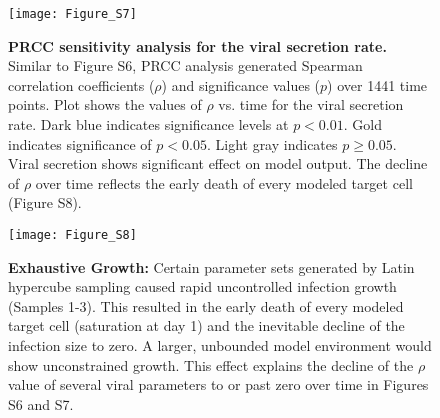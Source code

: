 \documentclass[preprint,10pt,authoryear]{article}
\newcommand{\drew}[1]{{\color{dkgreen}#1}}
\begin{document}
\begin{figure}[ht!]
\begin{center}
	\texttt{[image: Figure\_S7]}
	\caption{\textbf{PRCC sensitivity analysis for the viral secretion rate.} Similar to Figure S6, PRCC analysis generated Spearman correlation coefficients ($\rho$) and significance values ($p$) over 1441 time points.  Plot shows the values of $\rho$ vs. time for the viral secretion rate.  Dark blue indicates significance levels at $p < 0.01$.  Gold indicates significance of $p < 0.05$.  Light gray indicates $p \geq 0.05$.  Viral secretion shows significant effect on model output.  The decline of $\rho$ over time reflects the early death of every modeled target cell (Figure S8).}
	\label{fig:vsec}
\end{center}
\end{figure}

\begin{figure}[ht!]
\begin{center}
	\texttt{[image: Figure\_S8]}
	\caption{\textbf{Exhaustive Growth:} Certain parameter sets generated by Latin hypercube sampling caused rapid uncontrolled infection growth (Samples 1-3).  This resulted in the early death of every modeled target cell (saturation at day 1) and the inevitable decline of the infection size to zero.  A larger, unbounded model environment would show unconstrained growth.  This effect explains the decline of the $\rho$ value of several viral parameters to or past zero over time in Figures S6 and S7.}
	\label{fig:exhaustive}
\end{center}
\end{figure}






\end{document}
